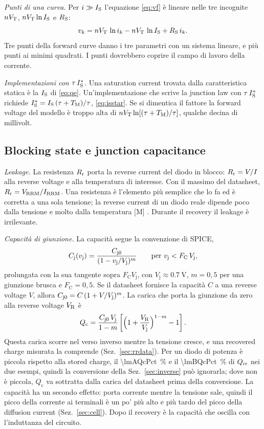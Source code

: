 \documentclass[10pt,a4paper]{scrartcl}
\let\newcommand\lmitdefine
\newcommand{\VR}{V_\mathrm{R}}
\newcommand{\Qrr}{Q_\mathrm{rr}}
\newcommand{\TM}{T_\mathrm{M}}
\newcommand{\vj}{v_\mathrm{j}}
\newcommand{\IS}{I_\mathrm{S}}
\newcommand{\RS}{R_\mathrm{S}}
\newcommand{\Rr}{R_\mathrm{r}}
\newcommand{\VT}{V_\mathrm{T}}
\newcommand{\Cj}{C_\mathrm{j}}
\newcommand{\Cjo}{C_\mathrm{j0}}
\newcommand{\Vrrm}{V_\mathrm{RRM}}
\newcommand{\Irrm}{I_\mathrm{RRM}}
\begin{document}
\emph{Punti di una curva.} Per $i \gg \IS$ l'equazione \eqref{eq:vf} è lineare nelle tre incognite $n\VT$, $n\VT\ln\IS$ e $\RS$:
\begin{equation}
v_k = n\VT\,\ln i_k - n\VT\,\ln\IS + \RS\, i_k .
\label{eq:points}
\end{equation}
Tre punti della forward curve danno i tre parametri con un sistema lineare, e più punti ai minimi quadrati. I punti dovrebbero coprire il campo di lavoro della corrente.

\emph{Implementazioni con $\tau\,\IS^{*}$.} Una saturation current trovata dalla caratteristica statica è la $\IS$ di \eqref{eq:qe}. Un'implementazione che scrive la junction law con $\tau\,\IS^{*}$ richiede $\IS^{*} = \IS\,(\tau+\TM)/\tau$, \eqref{eq:isstar}. Se si dimentica il fattore la forward voltage del modello è troppo alta di $n\VT\ln[(\tau+\TM)/\tau]$, qualche decina di millivolt.

\subsection{Blocking state e junction capacitance}
\label{sec:blocking}
\emph{Leakage.} La resistenza $\Rr$ porta la reverse current del diodo in blocco: $\Rr = V/I$ alla reverse voltage e alla temperatura di interesse. Con il massimo del datasheet, $\Rr = \Vrrm/\Irrm$. Una resistenza è l'elemento più semplice che lo fa ed è corretta a una sola tensione; la reverse current di un diodo reale dipende poco dalla tensione e molto dalla temperatura [M] \cite{lutz}. Durante il recovery il leakage è irrilevante.

\emph{Capacità di giunzione.} La capacità segue la convenzione di SPICE,
\begin{equation}
\Cj(\vj) = \frac{\Cjo}{(1 - \vj/V_\mathrm{j})^{m}} \qquad \text{per } \vj < F_\mathrm{C}\,V_\mathrm{j} ,
\label{eq:cj}
\end{equation}
prolungata con la sua tangente sopra $F_\mathrm{C} V_\mathrm{j}$, con $V_\mathrm{j} \approx \SI{0.7}{\volt}$, $m = 0,5$ per una giunzione brusca e $F_\mathrm{C} = 0,5$. Se il datasheet fornisce la capacità $C$ a una reverse voltage $V$, allora $\Cjo = C\,(1+V/V_\mathrm{j})^{m}$. La carica che porta la giunzione da zero alla reverse voltage $\VR$ è
\begin{equation}
Q_\mathrm{c} = \frac{\Cjo\,V_\mathrm{j}}{1-m}\left[\Bigl(1+\frac{\VR}{V_\mathrm{j}}\Bigr)^{1-m} - 1\right] .
\label{eq:qc}
\end{equation}
Questa carica scorre nel verso inverso mentre la tensione cresce, e una recovered charge misurata la comprende (Sez.~\ref{sec:rrdata}). Per un diodo di potenza è piccola rispetto alla stored charge, il \SI{\lmAQcPct}{\percent} e il \SI{\lmBQcPct}{\percent} di $\Qrr$ nei due esempi, quindi la conversione della Sez.~\ref{sec:inverse} può ignorarla; dove non è piccola, $Q_\mathrm{c}$ va sottratta dalla carica del datasheet prima della conversione. La capacità ha un secondo effetto: porta corrente mentre la tensione sale, quindi il picco della corrente ai terminali è un po' più alto e più tardo del picco della diffusion current (Sez.~\ref{sec:cell}). Dopo il recovery è la capacità che oscilla con l'induttanza del circuito.
\end{document}
